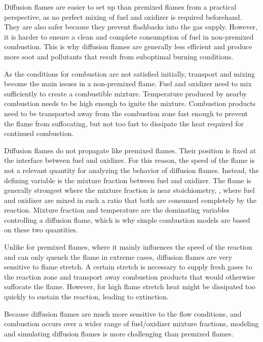 %
Diffusion flames are easier to set up than premixed flames from a practical
perspective, as no perfect mixing of fuel and oxidizer is required beforehand.
%
They are also safer because they prevent flashbacks into the gas supply.
%
However, it is harder to ensure a clean and complete consumption of fuel in
non-premixed combustion.
%
This is why diffusion flames are generally less efficient and produce more
soot and pollutants that result from suboptimal burning conditions.
%

%
As the conditions for combustion are not satisfied initially, transport and
mixing become the main issues in a non-premixed flame.
%
Fuel and oxidizer need to mix sufficiently to create a combustible mixture.
%
Temperature produced by nearby combustion needs to be high enough to ignite
the mixture.
%
Combustion products need to be transported away from the combustion zone fast
enough to prevent the flame from suffocating, but not too fast to dissipate the
heat required for continued combustion.
%

%
Diffusion flames do not propagate like premixed flames.
%
Their position is fixed at the interface between fuel and oxidizer.
%
For this reason, the speed of the flame is not a relevant quantity for
analyzing the behavior of diffusion flames.
%
Instead, the defining variable is the mixture fraction between fuel and
oxidizer.
%
The flame is generally strongest where the mixture fraction is near
stoichiometry, \ie{}, where fuel and oxidizer are mixed in such a ratio that
both are consumed completely by the reaction.
%
Mixture fraction and temperature are the dominating variables controlling a
diffusion flame, which is why simple combustion models are based on these two
quantities.
%

%
Unlike for premixed flames, where it mainly influences the speed of the reaction
and can only quench the flame in extreme cases, diffusion flames are very
sensitive to flame stretch.
%
A certain stretch is necessary to supply fresh gases to the reaction zone and
transport away combustion products that would otherwise suffocate the flame.
%
However, for high flame stretch heat might be dissipated too quickly to sustain
the reaction, leading to extinction.
%

%
Because diffusion flames are much more sensitive to the flow conditions, and
combustion occurs over a wider range of fuel/oxidizer mixture fractions,
modeling and simulating diffusion flames is more challenging than premixed
flames.
%
%
%
